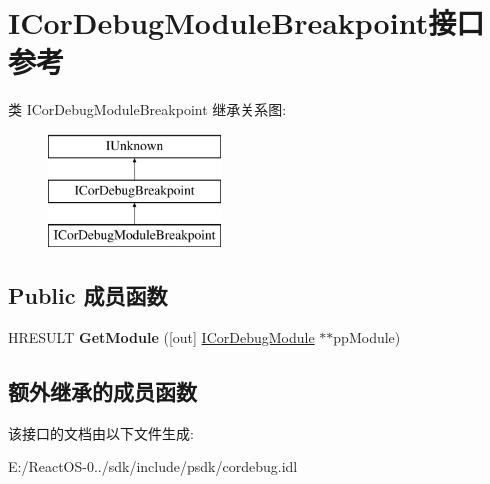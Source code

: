 \hypertarget{interface_i_cor_debug_module_breakpoint}{}\section{I\+Cor\+Debug\+Module\+Breakpoint接口 参考}
\label{interface_i_cor_debug_module_breakpoint}
类 I\+Cor\+Debug\+Module\+Breakpoint 继承关系图\+:\begin{figure}[H]
\begin{center}
\leavevmode
\includegraphics[height=3.000000cm]{interface_i_cor_debug_module_breakpoint}
\end{center}
\end{figure}
\subsection*{Public 成员函数}
\begin{DoxyCompactItemize}
\item 
\mbox{\label{interface_i_cor_debug_module_breakpoint_a1e6fbacf163d3589aaebbb6ceafdbf96}} 
H\+R\+E\+S\+U\+LT {\bfseries Get\+Module} (\mbox{[}out\mbox{]} \hyperlink{interface_i_cor_debug_module}{I\+Cor\+Debug\+Module} $\ast$$\ast$pp\+Module)
\end{DoxyCompactItemize}
\subsection*{额外继承的成员函数}


该接口的文档由以下文件生成\+:\begin{DoxyCompactItemize}
\item 
E\+:/\+React\+O\+S-\/0../sdk/include/psdk/cordebug.\+idl\end{DoxyCompactItemize}
